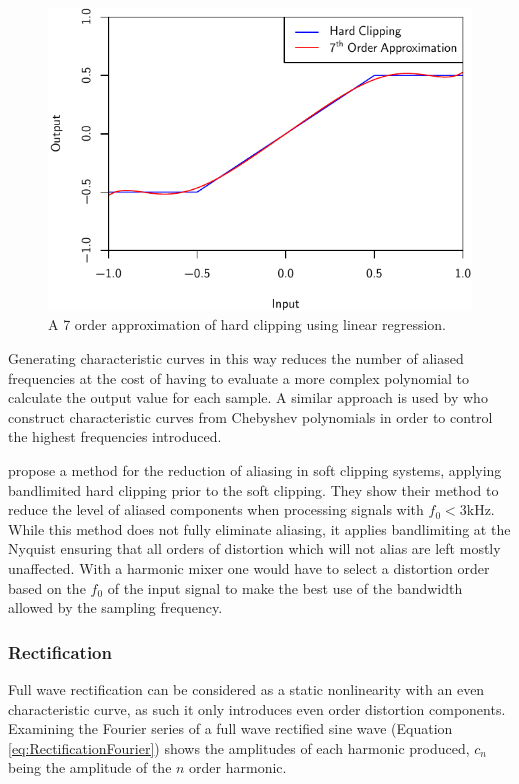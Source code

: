 			\begin{figure}[h!]
				\centering
				\includegraphics{chapter5/Images/ClippingApproximation.pdf}
				\caption{A 7 order approximation of hard clipping using linear regression.}
				\label{fig:ClippingApproximation}
			\end{figure}

			Generating characteristic curves in this way reduces the number of aliased frequencies at the cost
			of having to evaluate a more complex polynomial to calculate the output value for each sample. A
			similar approach is used by \citet{fernandez-cid2001distortion} who construct characteristic curves
			from Chebyshev polynomials in order to control the highest frequencies introduced.

			\citet{esqueda2015aliasing} propose a method for the reduction of aliasing in soft clipping
			systems, applying bandlimited hard clipping prior to the soft clipping. They show their method to
			reduce the level of aliased components when processing signals with $f_{0} < 3$kHz. While this
			method does not fully eliminate aliasing, it applies bandlimiting at the Nyquist ensuring that all
			orders of distortion which will not alias are left mostly unaffected. With a harmonic mixer one
			would have to select a distortion order based on the $f_{0}$ of the input signal to make the best
			use of the bandwidth allowed by the sampling frequency.

		\subsubsection*{Rectification}
			Full wave rectification can be considered as a static nonlinearity with an even characteristic
			curve, as such it only introduces even order distortion components. Examining the Fourier series of
			a full wave rectified sine wave (Equation \ref{eq:RectificationFourier}) shows the amplitudes of
			each harmonic produced, $c_{n}$ being the amplitude of the $n$ order harmonic.


